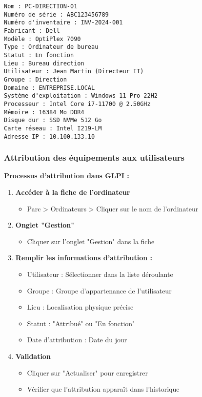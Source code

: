 \documentclass[12pt,a4paper]{article}
\begin{document}
\begin{lstlisting}[caption=Exemple de fiche poste de travail]
Nom : PC-DIRECTION-01
Numéro de série : ABC123456789
Numéro d'inventaire : INV-2024-001
Fabricant : Dell
Modèle : OptiPlex 7090
Type : Ordinateur de bureau
Statut : En fonction
Lieu : Bureau direction
Utilisateur : Jean Martin (Directeur IT)
Groupe : Direction
Domaine : ENTREPRISE.LOCAL
Système d'exploitation : Windows 11 Pro 22H2
Processeur : Intel Core i7-11700 @ 2.50GHz
Mémoire : 16384 Mo DDR4
Disque dur : SSD NVMe 512 Go
Carte réseau : Intel I219-LM
Adresse IP : 10.100.133.10
\end{lstlisting}

\subsubsection{Attribution des équipements aux utilisateurs}
\textbf{Processus d'attribution dans GLPI :}

\begin{enumerate}
    \item \textbf{Accéder à la fiche de l'ordinateur}
    \begin{itemize}
        \item Parc > Ordinateurs > Cliquer sur le nom de l'ordinateur
    \end{itemize}
    
    \item \textbf{Onglet "Gestion"}
    \begin{itemize}
        \item Cliquer sur l'onglet "Gestion" dans la fiche
    \end{itemize}
    
    \item \textbf{Remplir les informations d'attribution :}
    \begin{itemize}
        \item Utilisateur : Sélectionner dans la liste déroulante
        \item Groupe : Groupe d'appartenance de l'utilisateur
        \item Lieu : Localisation physique précise
        \item Statut : "Attribué" ou "En fonction"
        \item Date d'attribution : Date du jour
    \end{itemize}
    
    \item \textbf{Validation}
    \begin{itemize}
        \item Cliquer sur "Actualiser" pour enregistrer
        \item Vérifier que l'attribution apparaît dans l'historique
    \end{itemize}
\end{enumerate}
\end{document}
